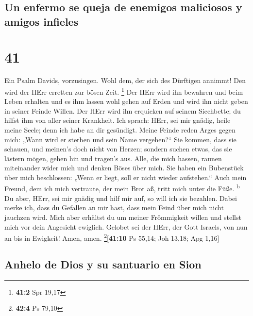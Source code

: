 \hypertarget{un-enfermo-se-queja-de-enemigos-maliciosos-y-amigos-infieles}{%
\subsection{Un enfermo se queja de enemigos maliciosos y amigos
infieles}\label{un-enfermo-se-queja-de-enemigos-maliciosos-y-amigos-infieles}}

\hypertarget{section-40}{%
\section{41}\label{section-40}}

 Ein Psalm Davids, vorzusingen.  Wohl dem,
der sich des Dürftigen annimmt! Den wird der HErr erretten zur bösen
Zeit. \footnote{\textbf{41:2} Spr 19,17}  Der HErr wird
ihn bewahren und beim Leben erhalten und es ihm lassen wohl gehen auf
Erden und wird ihn nicht geben in seiner Feinde Willen. 
Der HErr wird ihn erquicken auf seinem Siechbette; du hilfst ihm von
aller seiner Krankheit.  Ich sprach: HErr, sei mir gnädig,
heile meine Seele; denn ich habe an dir gesündigt.  Meine
Feinde reden Arges gegen mich: „Wann wird er sterben und sein Name
vergehen?{}``  Sie kommen, dass sie schauen, und meinen's
doch nicht von Herzen; sondern suchen etwas, das sie lästern mögen,
gehen hin und tragen's aus.  Alle, die mich hassen, raunen
miteinander wider mich und denken Böses über mich.  Sie
haben ein Bubenstück über mich beschlossen: „Wenn er liegt, soll er
nicht wieder aufstehen.``  Auch mein Freund, dem ich mich
vertraute, der mein Brot aß, tritt mich unter die Füße.
\textsuperscript{b}  Du aber, HErr, sei mir gnädig und
hilf mir auf, so will ich sie bezahlen.  Dabei merke ich,
dass du Gefallen an mir hast, dass mein Feind über mich nicht jauchzen
wird.  Mich aber erhältst du um meiner Frömmigkeit willen
und stellst mich vor dein Angesicht ewiglich.  Gelobet
sei der HErr, der Gott Israels, von nun an bis in Ewigkeit! Amen, amen.
\footnote{\textbf{42:4} Ps 79,10}{[}\textbf{41:10} Ps 55,14; Joh 13,18;
Apg 1,16{]}

\hypertarget{anhelo-de-dios-y-su-santuario-en-sion}{%
\subsection{Anhelo de Dios y su santuario en
Sion}\label{anhelo-de-dios-y-su-santuario-en-sion}}

